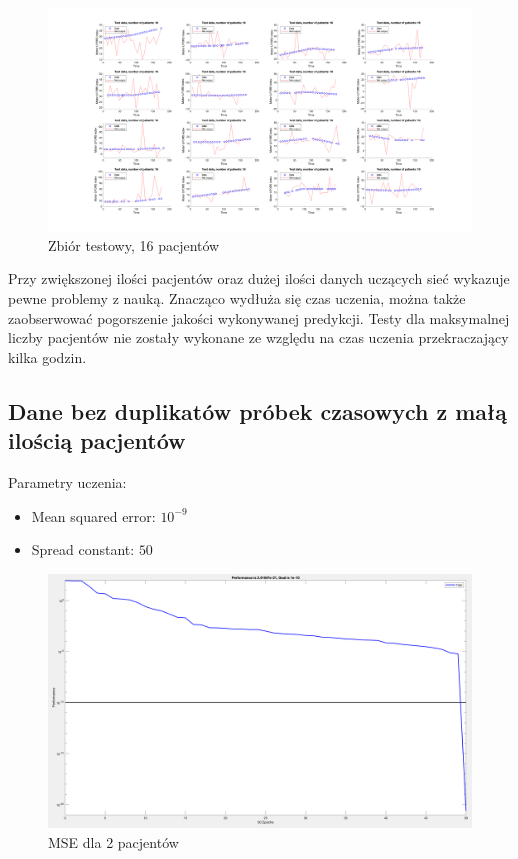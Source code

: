 \documentclass[12pt]{article}
\begin{document}
\begin{figure}[h!]

\centering
\includegraphics[width=1.2\textwidth]{test-normal-16.png}
\caption{Zbiór testowy, 16 pacjentów}

\end{figure}

\newpage

Przy zwiększonej ilości pacjentów oraz dużej ilości danych uczących sieć wykazuje pewne problemy z nauką. Znacząco wydłuża się czas uczenia, można także zaobserwować pogorszenie jakości wykonywanej predykcji. Testy dla maksymalnej liczby pacjentów nie zostały wykonane ze względu na czas uczenia przekraczający kilka godzin.

\subsection{Dane bez duplikatów próbek czasowych z małą ilością pacjentów}

Parametry uczenia:
\begin{itemize}
\item Mean squared error: $10^{-9}$
\item Spread constant: $50$
\end{itemize}

\begin{figure}[h!]

\centering
\includegraphics[width=1.0\textwidth]{mse-cut-2.png}
\caption{MSE dla 2 pacjentów}

\end{figure}
\end{document}
